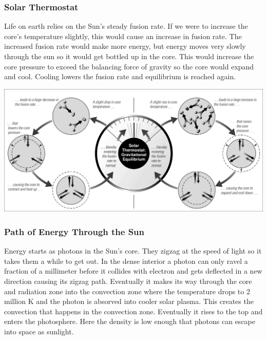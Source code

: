 \subsubsection{Solar Thermostat}
Life on earth relies on the Sun's steady fusion rate. If we were to increase the core's temperature slightly, this would cause an increase in fusion rate. The increased fusion rate would make more energy, but energy moves very slowly through the sun so it would get bottled up in the core. This would increase the core pressure to exceed the balancing force of gravity so the core would expand and cool. Cooling lowers the fusion rate and equilibrium is reached again.

\includegraphics[width=\textwidth]{solarThermostat}

\subsubsection{Path of Energy Through the Sun}
Energy starts as photons in the Sun's core. They zigzag at the speed of light so it takes them a while to get out. In the dense interior a photon can only ravel a fraction of a millimeter before it collides with electron and gets deflected in a new direction causing its zigzag path. Eventually it makes its way through the core and radiation zone into the convection zone where the temperature drops to 2 million K and the photon is absorved into cooler solar plasma. This creates the convection that happens in the convection zone. Eventually it rises to the top and enters the photosphere. Here the density is low enough that photons can escape into space as sunlight.

